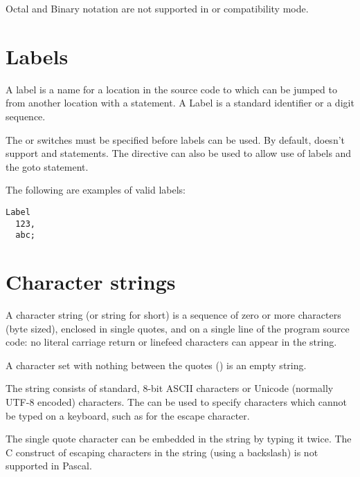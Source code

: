 \begin{remark}
Octal and Binary notation are not supported in  or 
compatibility mode.
\end{remark}

\section{Labels}
 
A label is a name for a location in the source code to which can be
jumped to from another location with a  statement. A Label is a
standard identifier or a digit sequence.

\begin{remark}
The  or  switches must be specified before
labels can be used. By default, \fpc doesn't support  and
 statements. The  directive can also be used
to allow use of labels and the goto statement.
\end{remark}
The following are examples of valid labels:
\begin{verbatim}
Label
  123,
  abc;
\end{verbatim}
\section{Character strings}
A character string (or string for short) is a sequence of zero or more
characters (byte sized), enclosed in single quotes, and on a single
line of the program source code: no literal carriage return or linefeed
characters can appear in the string.

A character set with nothing between the quotes () is an empty string.

The string consists of standard, 8-bit ASCII characters or Unicode (normally
UTF-8 encoded) characters. The  can be used to specify
characters which cannot be typed on a keyboard, such as  for
the escape character.

The single quote character can be embedded in the string by typing it twice.
The C construct of escaping characters in the string (using a backslash)
is not supported in Pascal.

